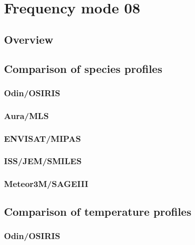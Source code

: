 \section{Frequency mode 08}
\label{sec:fm08}

\subsection{Overview}
\label{sec:fm08:overview}

\subsection{Comparison of species profiles}
\label{sec:fm08:comparison:species}

\subsubsection{Odin/OSIRIS}
\label{sec:fm08:comparison:species:osiris}

\subsubsection{Aura/MLS}
\label{sec:fm08:comparison:species:mls}

\subsubsection{ENVISAT/MIPAS}
\label{sec:fm08:comparison:species:mipas}

\subsubsection{ISS/JEM/SMILES}
\label{sec:fm08:comparison:species:smiles}

\subsubsection{Meteor3M/SAGEIII}
\label{sec:fm08:comparison:species:sage3}


\subsection{Comparison of temperature profiles}
\label{sec:fm08:comparison:temperature}

\subsubsection{Odin/OSIRIS}
\label{sec:fm08:comparison:temperature:osiris}

